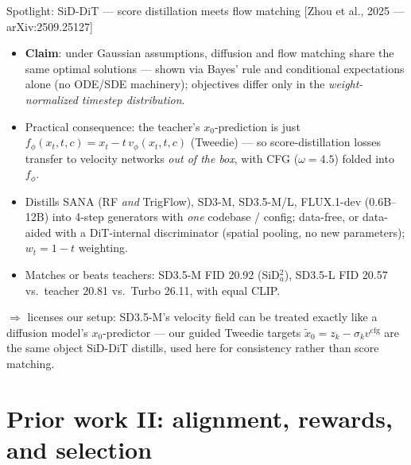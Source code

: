 \documentclass[aspectratio=169,10pt]{beamer}
\newcommand{\xtil}{\tilde{x}_0}
\newcommand{\litref}[1]{{\scriptsize\color{black!55}[#1]}}
\newcommand{\takeaway}[1]{\vspace{0.25em}$\Rightarrow$ \alert{#1}}
\begin{document}
\begin{frame}{Spotlight: SiD-DiT --- score distillation meets flow matching}
  \litref{Zhou et al., 2025 --- arXiv:2509.25127}
  \begin{itemize}
    \item \textbf{Claim}: under Gaussian assumptions, diffusion and flow
      matching share the same optimal solutions --- shown via Bayes' rule and
      conditional expectations alone (no ODE/SDE machinery); objectives
      differ only in the \emph{weight-normalized timestep distribution}.
    \item Practical consequence: the teacher's $x_0$-prediction is just
      $f_\phi(x_t,t,c) = x_t - t\, v_\phi(x_t,t,c)$ (Tweedie) --- so
      score-distillation losses transfer to velocity networks
      \emph{out of the box}, with CFG ($\omega{=}4.5$) folded into $f_\phi$.
    \item Distills SANA (RF \emph{and} TrigFlow), SD3-M, SD3.5-M/L, FLUX.1-dev
      (0.6B--12B) into 4-step generators with \emph{one} codebase / config;
      data-free, or data-aided with a DiT-internal discriminator (spatial
      pooling, no new parameters); $w_t = 1{-}t$ weighting.
    \item Matches or beats teachers: SD3.5-M FID 20.92 (SiD$^2_a$), SD3.5-L
      FID 20.57 vs.\ teacher 20.81 vs.\ Turbo 26.11, with equal CLIP.
  \end{itemize}
  \takeaway{licenses our setup: SD3.5-M's velocity field can be treated
  exactly like a diffusion model's $x_0$-predictor --- our guided Tweedie
  targets $\xtil = z_k - \sigma_k v^{\mathrm{cfg}}$ are the same object SiD-DiT
  distills, used here for consistency rather than score matching.}
\end{frame}

\section{Prior work II: alignment, rewards, and selection}
\end{document}
